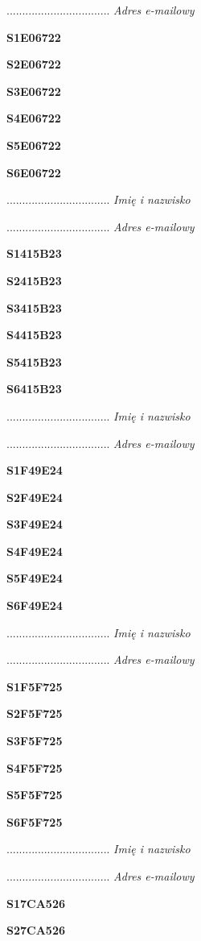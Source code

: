 .................................
\textit{Adres e-mailowy}

\Large \textbf{S1E06722}

\Large \textbf{S2E06722}

\Large \textbf{S3E06722}

\Large \textbf{S4E06722}

\Large \textbf{S5E06722}

\Large \textbf{S6E06722}

.................................
\textit{Imię i nazwisko}

.................................
\textit{Adres e-mailowy}

\Large \textbf{S1415B23}

\Large \textbf{S2415B23}

\Large \textbf{S3415B23}

\Large \textbf{S4415B23}

\Large \textbf{S5415B23}

\Large \textbf{S6415B23}

.................................
\textit{Imię i nazwisko}

.................................
\textit{Adres e-mailowy}

\Large \textbf{S1F49E24}

\Large \textbf{S2F49E24}

\Large \textbf{S3F49E24}

\Large \textbf{S4F49E24}

\Large \textbf{S5F49E24}

\Large \textbf{S6F49E24}

.................................
\textit{Imię i nazwisko}

.................................
\textit{Adres e-mailowy}

\Large \textbf{S1F5F725}

\Large \textbf{S2F5F725}

\Large \textbf{S3F5F725}

\Large \textbf{S4F5F725}

\Large \textbf{S5F5F725}

\Large \textbf{S6F5F725}

.................................
\textit{Imię i nazwisko}

.................................
\textit{Adres e-mailowy}

\Large \textbf{S17CA526}

\Large \textbf{S27CA526}

